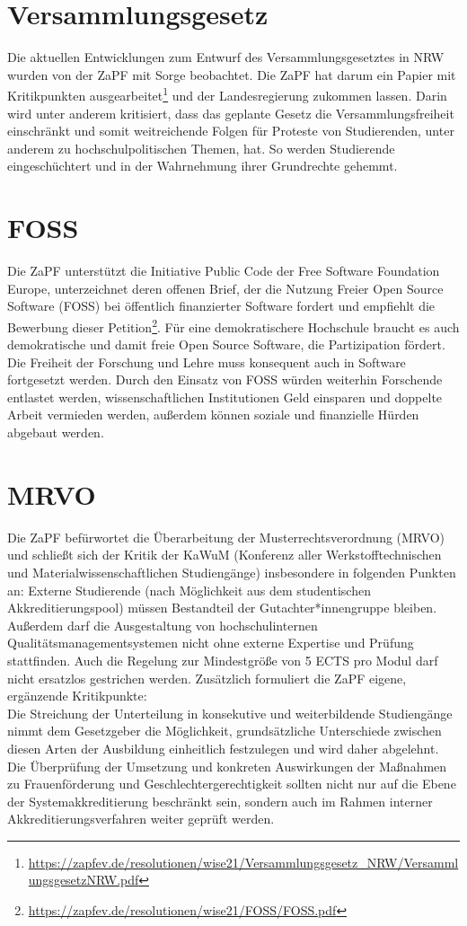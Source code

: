 \section*{Versammlungsgesetz}
Die aktuellen Entwicklungen zum Entwurf des Versammlungsgesetztes in NRW wurden von der ZaPF mit Sorge beobachtet. Die ZaPF hat darum ein Papier mit Kritikpunkten ausgearbeitet\footnote{\url{https://zapfev.de/resolutionen/wise21/Versammlungsgesetz_NRW/VersammlungsgesetzNRW.pdf}} und der Landesregierung zukommen lassen. Darin wird unter anderem kritisiert, dass das geplante Gesetz die Versammlungsfreiheit einschränkt und somit weitreichende Folgen für Proteste von Studierenden, unter anderem zu hochschulpolitischen Themen, hat. So werden Studierende eingeschüchtert und in der Wahrnehmung ihrer Grundrechte gehemmt.

\section*{FOSS}
Die ZaPF unterstützt die Initiative Public Code der Free Software Foundation Europe, unterzeichnet deren offenen Brief, der die Nutzung Freier Open Source Software (FOSS) bei öffentlich finanzierter Software fordert und empfiehlt die Bewerbung dieser Petition\footnote{\url{https://zapfev.de/resolutionen/wise21/FOSS/FOSS.pdf}}. Für eine demokratischere Hochschule braucht es auch demokratische und damit freie Open Source Software, die Partizipation fördert. Die Freiheit der Forschung und Lehre muss konsequent auch in Software fortgesetzt werden. Durch den Einsatz von FOSS würden weiterhin Forschende entlastet werden, wissenschaftlichen Institutionen Geld einsparen und doppelte Arbeit vermieden werden, außerdem können soziale und finanzielle Hürden abgebaut werden. 

\section*{MRVO} 
Die ZaPF befürwortet die Überarbeitung der Musterrechtsverordnung (MRVO) und schließt sich der Kritik der KaWuM (Konferenz aller Werkstofftechnischen und Materialwissenschaftlichen Studiengänge) insbesondere in folgenden Punkten an: Externe Studierende (nach Möglichkeit aus dem studentischen Akkreditierungspool) müssen Bestandteil der Gutachter*innengruppe bleiben. Außerdem darf die Ausgestaltung von hochschulinternen Qualitätsmanagementsystemen nicht ohne externe Expertise und Prüfung stattfinden. Auch die Regelung zur Mindestgröße von 5 ECTS pro Modul darf nicht ersatzlos gestrichen werden. Zusätzlich formuliert die ZaPF eigene, ergänzende Kritikpunkte:\\ Die Streichung der Unterteilung in konsekutive und weiterbildende Studiengänge nimmt dem Gesetzgeber die Möglichkeit, grundsätzliche Unterschiede zwischen diesen Arten der Ausbildung einheitlich festzulegen und wird daher abgelehnt. Die Überprüfung der Umsetzung und konkreten Auswirkungen der Maßnahmen zu Frauenförderung und Geschlechtergerechtigkeit sollten nicht nur auf die Ebene der Systemakkreditierung beschränkt sein, sondern auch im Rahmen interner Akkreditierungsverfahren weiter geprüft werden.

